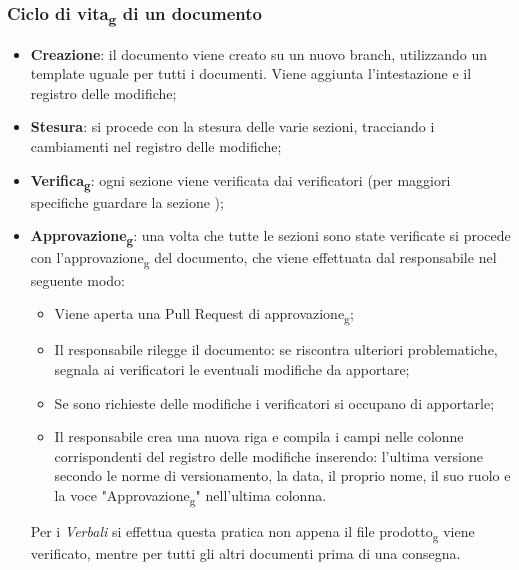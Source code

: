 \subsubsection{Ciclo di vita\textsubscript{g} di un documento}
\begin{itemize}
    \item \textbf{Creazione}: il documento viene creato su un nuovo branch, utilizzando un template uguale per tutti i documenti. 
    Viene aggiunta l’intestazione e il registro delle modifiche;
    \item \textbf{Stesura}: si procede con la stesura delle varie sezioni, tracciando i cambiamenti nel registro delle modifiche; 
    \item \textbf{Verifica\textsubscript{g}}: ogni sezione viene verificata dai verificatori (per maggiori specifiche guardare la 
    sezione ); 
    \item \textbf{Approvazione\textsubscript{g}}: una volta che tutte le sezioni sono state verificate si procede 
    con l’approvazione\textsubscript{g} del documento, che viene effettuata dal responsabile nel seguente modo:
    \begin{itemize}
        \item Viene aperta una Pull Request di approvazione\textsubscript{g};
        \item Il responsabile rilegge il documento: se riscontra ulteriori problematiche, segnala ai verificatori le eventuali modifiche da apportare;
        \item Se sono richieste delle modifiche i verificatori si occupano di apportarle;
        \item Il responsabile crea una nuova riga e compila i campi nelle colonne corrispondenti del registro delle modifiche 
        inserendo: l'ultima versione secondo le norme di versionamento, la data, il proprio nome, il suo ruolo e la voce "Approvazione\textsubscript{g}" nell'ultima colonna.
    \end{itemize}
    Per i \textit{Verbali} si effettua questa pratica non appena il file prodotto\textsubscript{g} viene 
    verificato, mentre per tutti gli altri documenti prima di una consegna.
\end{itemize}